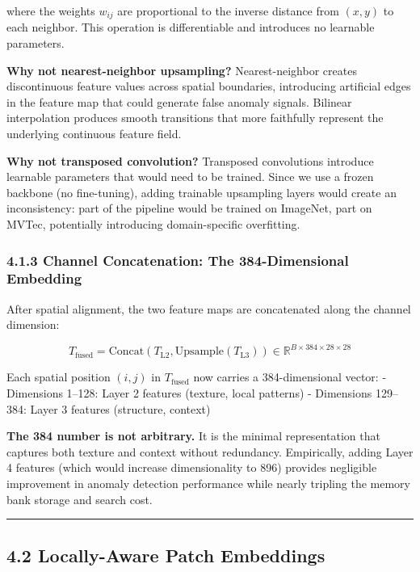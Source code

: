 where the weights \(w_{ij}\) are proportional to the inverse distance from \((x, y)\) to each neighbor. This operation is differentiable and introduces no learnable parameters.

\textbf{Why not nearest-neighbor upsampling?} Nearest-neighbor creates discontinuous feature values across spatial boundaries, introducing artificial edges in the feature map that could generate false anomaly signals. Bilinear interpolation produces smooth transitions that more faithfully represent the underlying continuous feature field.

\textbf{Why not transposed convolution?} Transposed convolutions introduce learnable parameters that would need to be trained. Since we use a frozen backbone (no fine-tuning), adding trainable upsampling layers would create an inconsistency: part of the pipeline would be trained on ImageNet, part on MVTec, potentially introducing domain-specific overfitting.

\subsubsection{4.1.3 Channel Concatenation: The 384-Dimensional Embedding}\label{channel-concatenation-the-384-dimensional-embedding}

After spatial alignment, the two feature maps are concatenated along the channel dimension:

\[T_{\text{fused}} = \text{Concat}(T_{\text{L2}}, \text{Upsample}(T_{\text{L3}})) \in \mathbb{R}^{B \times 384 \times 28 \times 28}\]

Each spatial position \((i, j)\) in \(T_{\text{fused}}\) now carries a 384-dimensional vector: - Dimensions 1--128: Layer 2 features (texture, local patterns) - Dimensions 129--384: Layer 3 features (structure, context)

\textbf{The 384 number is not arbitrary.} It is the minimal representation that captures both texture and context without redundancy. Empirically, adding Layer 4 features (which would increase dimensionality to 896) provides negligible improvement in anomaly detection performance while nearly tripling the memory bank storage and search cost.

\begin{center}\rule{0.5\linewidth}{0.5pt}\end{center}

\subsection{4.2 Locally-Aware Patch Embeddings}\label{locally-aware-patch-embeddings}

